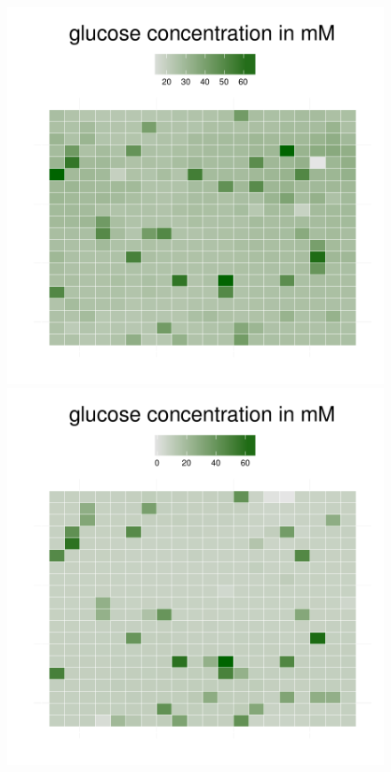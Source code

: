 \begin{figure}[h!]
{\begin{minipage}[t]{0.3\textwidth}
  \end{minipage}
  \begin{minipage}[t]{0.3\textwidth}
    \includegraphics[width=\textwidth]{../results/barkeri_ecoli_20x20_seed4612_gluc100.pdf}
  \end{minipage}
  \begin{minipage}[t]{0.3\textwidth}
    \includegraphics[width=\textwidth]{../results/barkeri_ecoli_20x20_seed4612_gluc150.pdf}

\end{minipage}}
\end{figure}
